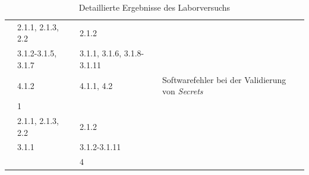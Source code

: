 \begin{table}[htp]
\begin{tabularx}{\columnwidth}{lXXl}
                                                                                  & 2.1.1, 2.1.3, 2.2                                                           & 2.1.2                                                                                       &                                                         \\
                                                                                  & 3.1.2{-}3.1.5, 3.1.7                                                        & 3.1.1, 3.1.6, 3.1.8{-}3.1.11                                                                &                                                         \\
                                                                                  & 4.1.2                                                                       & 4.1.1, 4.2                                                                                  & Softwarefehler bei der Validierung von \textit{Secrets} \\
    \midrule
                                          & 1                                                                           &                                                                                             &                                                         \\
                                                                                  & 2.1.1, 2.1.3, 2.2                                                           & 2.1.2                                                                                       &                                                         \\
                                                                                  & 3.1.1                                                                       & 3.1.2{-}3.1.11                                                                              &                                                         \\
                                                                                  &                                                                             & 4                                                                                           &                                                         \\
    \bottomrule
  \end{tabularx}
  \caption{Detaillierte Ergebnisse des Laborversuchs}
  \label{tbl:long-results-experiment}
\end{table}



